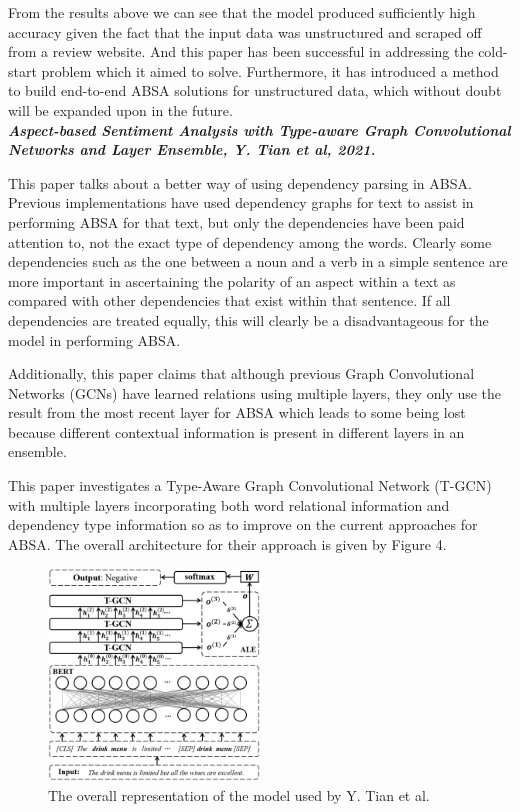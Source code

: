 \documentclass[conference]{IEEEtran}
\begin{document}
From the results above we can see that the model produced sufficiently high accuracy given the fact that the input data was unstructured and scraped off from a review website. And this paper has been successful in addressing the cold-start problem which it aimed to solve. Furthermore, it has introduced a method to build end-to-end ABSA solutions for unstructured data, which without doubt will be expanded upon in the future.\\

\textit{\textbf{Aspect-based Sentiment Analysis with
Type-aware Graph Convolutional Networks and Layer Ensemble, Y. Tian et al, 2021.}}

This paper talks about a better way of using dependency parsing in ABSA. Previous implementations have used dependency graphs for text to assist in performing ABSA for that text, but only the dependencies have been paid attention to, not the exact type of dependency among the words. Clearly some dependencies such as the one between a noun and a verb in a simple sentence are more important in ascertaining the polarity of an aspect within a text as compared with other dependencies that exist within that sentence. If all dependencies are treated equally, this will clearly be a disadvantageous for the model in performing ABSA.

Additionally, this paper claims that although previous Graph Convolutional Networks (GCNs) have learned relations using multiple layers, they only use the result from the most recent layer for ABSA which leads to some being lost because different contextual information is present in different layers in an ensemble.

This paper investigates a Type-Aware Graph Convolutional Network (T-GCN) with multiple layers incorporating both word relational information and dependency type information so as to improve on the current approaches for ABSA. The overall architecture for their approach is given by Figure 4.

\begin{figure}[htbp]
\centerline{\includegraphics[keepaspectratio, width=0.5\textwidth]{pics/4.png}}
\caption{The overall representation of the model used by Y. Tian et al.}
\label{fig}
\end{figure}
\end{document}
